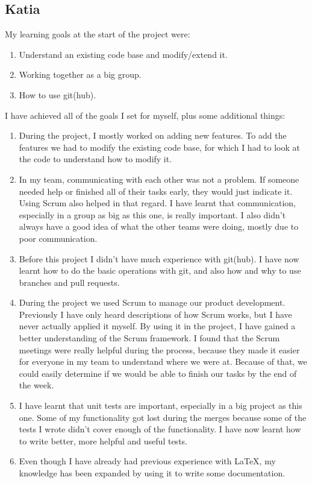 \documentclass{article}
\begin{document}
\subsection*{Katia}
My learning goals at the start of the project were:
\begin{enumerate}
\item Understand an existing code base and modify/extend it.
\item Working together as a big group.
\item How to use git(hub).
\end{enumerate}
I have achieved all of the goals I set for myself, plus some additional things:
\begin{enumerate}
\item During the project, I mostly worked on adding new features. To add the features we had to modify the existing code base, for which I had to look at the code to understand how to modify it.
\item In my team, communicating with each other was not a problem. If someone needed help or finished all of their tasks early, they would just indicate it. Using Scrum also helped in that regard. I have learnt that communication, especially in a group as big as this one, is really important. I also didn't always have a good idea of what the other teams were doing, mostly due to poor communication.
\item Before this project I didn't have much experience with git(hub). I have now learnt how to do the basic operations with git, and also how and why to use branches and pull requests.
\item During the project we used Scrum to manage our product development. Previously I have only heard descriptions of how Scrum works, but I have never actually applied it myself. By using it in the project, I have gained a better understanding of the Scrum framework. I found that the Scrum meetings were really helpful during the process, because they made it easier for everyone in my team to understand where we were at. Because of that, we could easily determine if we would be able to finish our tasks by the end of the week.
\item I have learnt that unit tests are important, especially in a big project as this one. Some of my functionality got lost during the merges because some of the tests I wrote didn't cover enough of the functionality. I have now learnt how to write better, more helpful and useful tests.
\item Even though I have already had previous experience with \LaTeX, my knowledge has been expanded by using it to write some documentation.


\end{enumerate}
\end{document}
